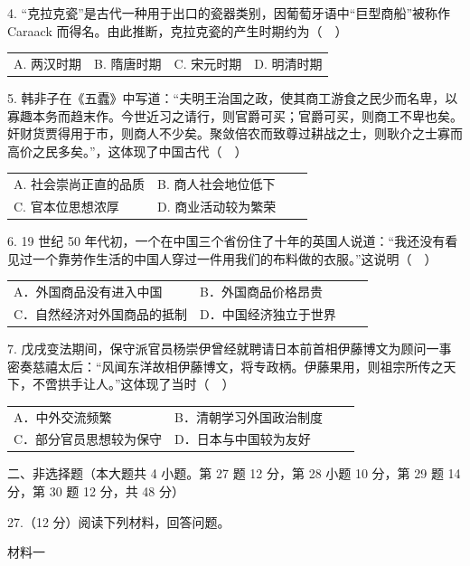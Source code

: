 \documentclass{ctexart}
\begin{document}
4. “克拉克瓷”是古代一种用于出口的瓷器类别，因葡萄牙语中“巨型商船”被称作 Caraack 而得名。由此推断，克拉克瓷的产生时期约为（　）

\begin{tabularx}{\linewidth}{XXXX}

A. 两汉时期 &
B. 隋唐时期 &
C. 宋元时期 &
D. 明清时期

\end{tabularx}

5. 韩非子在《五蠹》中写道：“夫明王治国之政，使其商工游食之民少而名卑，以寡趣本务而趋末作。今世近习之请行，则官爵可买；官爵可买，则商工不卑也矣。奸财货贾得用于市，则商人不少矣。聚敛倍农而致尊过耕战之士，则耿介之士寡而高价之民多矣。”，这体现了中国古代（　）

\begin{tabularx}{\linewidth}{XXXX}

A. 社会崇尚正直的品质 &
B. 商人社会地位低下 \\
C. 官本位思想浓厚 &
D. 商业活动较为繁荣

\end{tabularx}

6. 19 世纪 50 年代初，一个在中国三个省份住了十年的英国人说道：“我还没有看见过一个靠劳作生活的中国人穿过一件用我们的布料做的衣服。”这说明（　）

\begin{tabularx}{\linewidth}{XXXX}

A．外国商品没有进入中国 &
B．外国商品价格昂贵 \\
C．自然经济对外国商品的抵制 &
D．中国经济独立于世界

\end{tabularx}

7. 戊戌变法期间，保守派官员杨崇伊曾经就聘请日本前首相伊藤博文为顾问一事密奏慈禧太后：“风闻东洋故相伊藤博文，将专政柄。伊藤果用，则祖宗所传之天下，不啻拱手让人。”这体现了当时（　）

\begin{tabularx}{\linewidth}{XXXX}

A．中外交流频繁 &
B．清朝学习外国政治制度 \\
C．部分官员思想较为保守 &
D．日本与中国较为友好

\end{tabularx}

\textsf{二、非选择题（本大题共 4 小题。第 27 题 12 分，第 28 小题 10 分，第 29 题 14 分，第 30 题 12 分，共 48 分）}

27.（12 分）阅读下列材料，回答问题。

\textsf{材料一}
\end{document}
